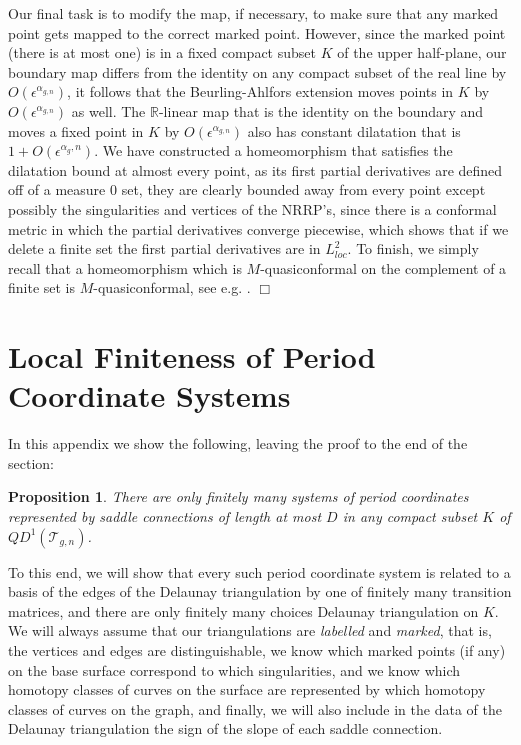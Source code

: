 \documentclass[12pt]{article}
\newtheorem{proposition}[theorem]{Proposition}
\newcommand{\rr}{\mathbb{R}}
\begin{document}
\noindent Our final task is to modify the map, if necessary, to make sure that any marked point gets mapped to the correct marked point. However, since the marked point (there is at most one) is in a fixed compact subset $K$ of the upper half-plane, our boundary map differs from the identity on any compact subset of the real line by $O(\epsilon^{\alpha_{g,n}})$, it follows that the Beurling-Ahlfors extension moves points in $K$ by $O(\epsilon^{\alpha_{g,n}})$ as well. The $\rr$-linear map that is the identity on the boundary and moves a fixed point in $K$ by $O(\epsilon^{\alpha_{g,n}})$ also has constant dilatation that is $1 + O(\epsilon^{\alpha_g,n})$. We have constructed a homeomorphism that satisfies the dilatation bound at almost every point, as its first partial derivatives are defined off of a measure $0$ set, they are clearly bounded away from every point except possibly the singularities and vertices of the NRRP's, since there is a conformal metric in which the partial derivatives converge piecewise, which shows that if we delete a finite set the first partial derivatives are in $L_{loc}^2.$ To finish, we simply recall that a homeomorphism which is $M$-quasiconformal on the complement of a finite set is $M$-quasiconformal, see e.g. \cite{Hubbard}. $\Box$

\appendix

\section{Local Finiteness of Period Coordinate Systems}

In this appendix we show the following, leaving the proof to the end of the section:

\begin{proposition}\label{PropLocallyFinite} There are only finitely many systems of period coordinates represented by saddle connections of length at most $D$ in any compact subset $K$ of $QD^1(\mathcal{T}_{g,n})$. \end{proposition}

\noindent To this end, we will show that every such period coordinate system is related to a basis of the edges of the Delaunay triangulation by one of finitely many transition matrices, and there are only finitely many choices Delaunay triangulation on $K$. We will always assume that our triangulations are \emph{labelled} and \emph{marked}, that is, the vertices and edges are distinguishable, we know which marked points (if any) on the base surface correspond to which singularities, and we know which homotopy classes of curves on the surface are represented by which homotopy classes of curves on the graph, and finally, we will also include in the data of the Delaunay triangulation the sign of the slope of each saddle connection.
\end{document}
